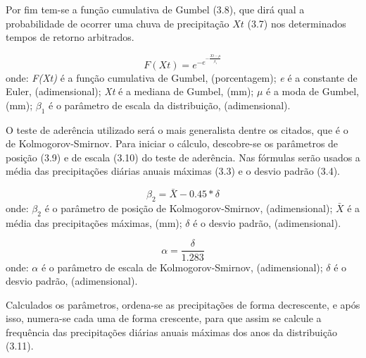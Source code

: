 Por fim tem-se a função cumulativa de Gumbel (3.8), que dirá qual a probabilidade de ocorrer uma chuva de precipitação $Xt$ (3.7) nos determinados tempos de retorno arbitrados.\bigskip

\begin{equation}
F(Xt) = e^{- e^{- \frac{Xt - \mu}{\beta_{1}}}}
\end{equation}
\newline
onde:
\newline
\textit{F(Xt)} é a função cumulativa de Gumbel, (porcentagem);
\newline
\textit{e} é a constante de Euler, (adimensional);
\newline
\textit{Xt} é a mediana de Gumbel, (mm);
\newline
$\mu$ é a moda de Gumbel, (mm);
\newline
$\beta_{1}$ é o parâmetro de escala da distribuição, (adimensional).\bigskip

\bigskip

O teste de aderência utilizado será o mais generalista dentre os citados, que é o de Kolmogorov-Smirnov. Para iniciar o cálculo, descobre-se os parâmetros de posição (3.9) e de escala (3.10) do teste de aderência. Nas fórmulas serão usados a média das precipitações diárias anuais máximas (3.3) e o desvio padrão (3.4).\bigskip

\begin{equation}
\beta_{2} = \bar{X} - 0.45 * \delta
\end{equation}
\newline
onde:
\newline
$\beta_{2}$ é o parâmetro de posição de Kolmogorov-Smirnov, (adimensional);
\newline
$\bar{X}$ é a média das precipitações máximas, (mm);
\newline
$\delta$ é o desvio padrão, (adimensional).\bigskip

\begin{equation}
\alpha = \frac{\delta}{1.283}
\end{equation}
\newline
onde:
\newline
$\alpha$ é o parâmetro de escala de Kolmogorov-Smirnov, (adimensional);
\newline
$\delta$ é o desvio padrão, (adimensional).\bigskip

Calculados os parâmetros, ordena-se as precipitações de forma decrescente, e após isso, numera-se cada uma de forma crescente, para que assim se calcule a frequência das precipitações diárias anuais máximas dos anos da distribuição (3.11).\bigskip

